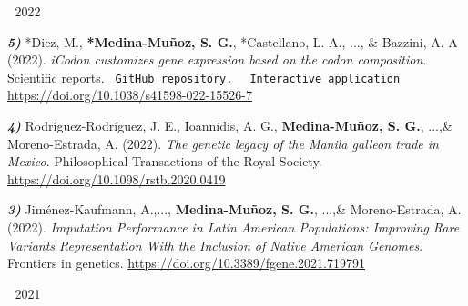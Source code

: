 \begin{cventries}
\cventry
{$\;$}
{2022}
{$\;$}
{$\;$}
{
  \begin{cvitems} %
      \item {
          \begin{flushleft}
            \textit{\textbf{5)}} *Diez, M., \textbf{*Medina-Muñoz, S. G.}, *Castellano, L. A., ..., \& Bazzini, A. A (2022).
            \textit{iCodon customizes gene expression based on the codon composition}. Scientific reports.
              \texttt{
              \href{https://github.com/santiago1234/iCodon}{GitHub repository.}
              }
              \texttt{
              \href{http://icodon.org/}{Interactive application}
              } \linebreak
            \url{https://doi.org/10.1038/s41598-022-15526-7}
          \end{flushleft}
        }
      \item {
        \begin{flushleft}
          \textit{\textbf{4)}} Rodríguez-Rodríguez, J. E., Ioannidis, A. G., \textbf{Medina-Muñoz, S. G.}, ...,\& Moreno-Estrada, A. (2022).
          \textit{The genetic legacy of the Manila galleon trade in Mexico}. Philosophical Transactions of the Royal Society.
          \linebreak
          \url{https://doi.org/10.1098/rstb.2020.0419}
        \end{flushleft}
      }
      \item {
        \begin{flushleft}
          \textit{\textbf{3)}} Jiménez-Kaufmann, A.,..., \textbf{Medina-Muñoz, S. G.}, ...,\& Moreno-Estrada, A. (2022).
          \textit{Imputation Performance in Latin American Populations: Improving Rare Variants Representation With the Inclusion of Native American Genomes}. Frontiers in genetics.
          \linebreak
          \url{https://doi.org/10.3389/fgene.2021.719791}
        \end{flushleft}
      }
  \end{cvitems}
}
  \cventry
    {$\;$}
    {2021}
    {$\;$}
    {$\;$}
    {
      \begin{cvitems} %
        \item {
            \begin{flushleft}

\end{flushleft}}
\end{cvitems}}
\end{cventries}

